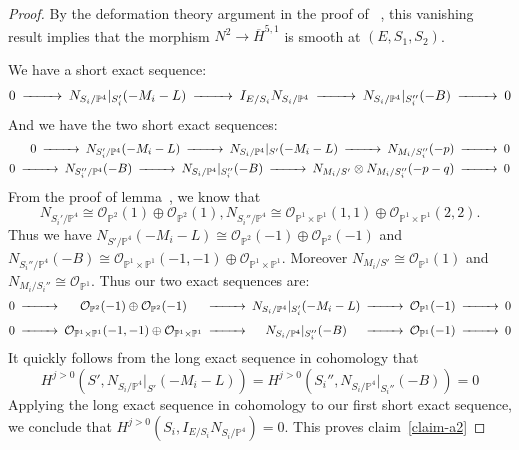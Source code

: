 \documentclass[amssymb,twoside,12 pt,amscd,reqno]{amsart}
\theoremstyle{plain}
\theoremstyle{definition}
\newcommand{\PP}{\mathbb{P}}
\def\ps{\vspace{4pt}}
\newcommand{\OO}{\mathcal O}
\begin{document}
\begin{proof}
By the deformation theory argument in the proof of ~\cite[lemma
6.2]{HRS1}, 
this vanishing result implies that the
morphism $N^2\rightarrow \overline{H}^{5,1}$ is smooth at
$(E,S_1,S_2)$. 

\ps

We have a short exact sequence:
\begin{equation}
\begin{CD}
0 @>>> N_{S_i/\PP^4}|_{S_i'}(-M_i-L) @>>> I_{E/S_i}N_{S_i/\PP^4} @>>>
N_{S_i/\PP^4}|_{S_i''}(-B) @>>> 0 \end{CD}
\end{equation}
And we have the two short exact sequences:
\begin{eqnarray}
\begin{CD}
0 @>>> N_{S_i'/\PP^4}(-M_i-L) @>>> N_{S_i/\PP^4}|_{S'}(-M_i-L) @>>>
N_{M_i/S_i''}(-p) @>>> 0 \end{CD} \\
\begin{CD}
0 @>>> N_{S_i''/\PP^4}(-B) @>>> N_{S_i/\PP^4}|_{S_i''}(-B) @>>>
N_{M_i/S'}\otimes N_{M_i/S_i''}(-p-q) @>>> 0 \end{CD}
\end{eqnarray}
From the proof of lemma~\cite[lemma 6.3]{HRS1}, we know that 
\begin{equation}
N_{S_i'/\PP^4}
\cong \OO_{\PP^2}(1) \oplus \OO_{\PP^2}(1), N_{S_i''/\PP^4} \cong
\OO_{\PP^1\times \PP^1}(1,1) \oplus \OO_{\PP^1\times\PP^1}(2,2).
\end{equation}
Thus we have $N_{S'/\PP^4}(-M_i-L)\cong \OO_{\PP^2}(-1)\oplus
\OO_{\PP^2}(-1)$ and $N_{S_i''/\PP^4}(-B)\cong
\OO_{\PP^1\times\PP^1}(-1,-1) \oplus \OO_{\PP^1\times\PP^1}$.
Moreover $N_{M_i/S'}\cong \OO_{\PP^1}(1)$ and $N_{M_i/S_i''}\cong
\OO_{\PP^1}$.  Thus our two exact sequences are:
\begin{equation}
\begin{CD}
0 @>>> \OO_{\PP^2}(-1) \oplus \OO_{\PP^2}(-1) @>>>
N_{S_i/\PP^4}|_{S_i'}(-M_i-L) @>>> \OO_{\PP^1}(-1) @>>> 0 \\
0 @>>> \OO_{\PP^1\times\PP^1}(-1,-1) \oplus \OO_{\PP^1\times\PP^1}
@>>> N_{S_i/\PP^4}|_{S_i''}(-B) @>>> \OO_{\PP^1}(-1) @>>> 0 \end{CD}
\end{equation}
It quickly follows from the long exact sequence in cohomology that
\begin{equation}
H^{j>0}(S',N_{S_i/\PP^4}|_{S'}(-M_i-L)) =
H^{j>0}(S_i'',N_{S_i/\PP^4}|_{S_i''}(-B)) = 0
\end{equation}
Applying the long exact sequence in cohomology to our first short
exact sequence, we conclude that $H^{j>0}(S_i,I_{E/S_i}N_{S_i/\PP^4})
= 0$.  This proves claim~\ref{claim-a2}


\end{proof}
\end{document}
